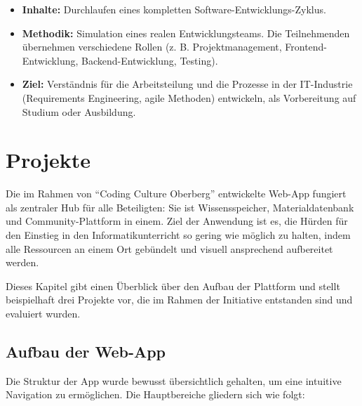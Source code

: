 \documentclass[a5paper,pagesize,10pt,bibtotoc,pointlessnumbers,
normalheadings,DIV=9,twoside=false]{scrbook}
\begin{document}
\begin{itemize}
    \item \textbf{Inhalte:} Durchlaufen eines kompletten Software-Entwick\-lungs-Zyklus.
    \item \textbf{Methodik:} Simulation eines realen Entwicklungsteams. Die Teilnehmenden übernehmen verschiedene Rollen (z. B. Projektmanagement, Frontend-Entwicklung, Backend-Entwicklung, Testing).
    \item \textbf{Ziel:} Verständnis für die Arbeitsteilung und die Prozesse in der IT-Industrie (Requirements Engineering, agile Methoden) entwickeln, als Vorbereitung auf Studium oder Ausbildung.
\end{itemize}

\chapter{Projekte}

Die im Rahmen von ``Coding Culture Oberberg'' entwickelte Web-App fungiert als zentraler Hub für alle Beteiligten: Sie ist Wissensspeicher, Materialdatenbank und Community-Plattform in einem. Ziel der Anwendung ist es, die Hürden für den Einstieg in den Informatikunterricht so gering wie möglich zu halten, indem alle Ressourcen an einem Ort gebündelt und visuell ansprechend aufbereitet werden.

Dieses Kapitel gibt einen Überblick über den Aufbau der Plattform und stellt beispielhaft drei Projekte vor, die im Rahmen der Initiative entstanden sind und evaluiert wurden.

\section*{Aufbau der Web-App}

Die Struktur der App wurde bewusst übersichtlich gehalten, um eine intuitive Navigation zu ermöglichen. Die Hauptbereiche gliedern sich wie folgt:
\end{document}
